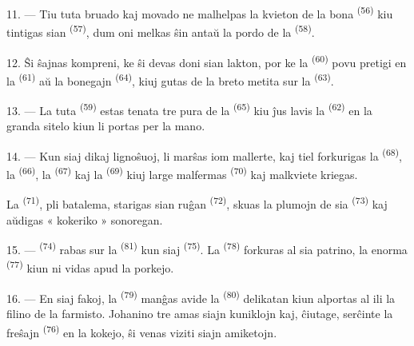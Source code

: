 11. --- Tiu tuta bruado kaj movado ne malhelpas la kvieton de la bona
 \textsuperscript{(56)} kiu tintigas sian
 \textsuperscript{(57)}, dum oni melkas ŝin antaŭ la pordo
de la  \textsuperscript{(58)}.

12. Ŝi ŝajnas kompreni, ke ŝi devas doni sian lakton, por ke la
 \textsuperscript{(60)} povu pretigi  en la
 \textsuperscript{(61)} aŭ la bonegajn 
\textsuperscript{(64)}, kiuj gutas de la breto metita sur la 
\textsuperscript{(63)}.

13. --- La tuta  \textsuperscript{(59)} estas tenata tre pura de
la  \textsuperscript{(65)} kiu ĵus lavis la
 \textsuperscript{(62)} en la granda sitelo kiun li portas
per la mano.

\VUsaut{3.0mm}
\VUsaut{3.0mm}

14. --- Kun siaj dikaj lignoŝuoj, li marŝas iom mallerte, kaj tiel forkurigas
la  \textsuperscript{(68)}, la 
\textsuperscript{(66)}, la  \textsuperscript{(67)} kaj la
 \textsuperscript{(69)} kiuj large malfermas  \textsuperscript{(70)} kaj malkviete kriegas.

La  \textsuperscript{(71)}, pli batalema, starigas sian ruĝan
 \textsuperscript{(72)}, skuas la plumojn de sia 
\textsuperscript{(73)} kaj aŭdigas « kokeriko » sonoregan.

15. ---  \textsuperscript{(74)} rabas sur la
 \textsuperscript{(81)} kun siaj 
\textsuperscript{(75)}. La  \textsuperscript{(78)} forkuras al
sia patrino, la enorma  \textsuperscript{(77)} kiun ni vidas
apud la porkejo.

16. --- En siaj fakoj, la  \textsuperscript{(79)} manĝas avide
la  \textsuperscript{(80)} delikatan kiun alportas al ili la
filino de la farmisto. Johanino tre amas siajn kuniklojn kaj, ĉiutage,
serĉinte la freŝajn  \textsuperscript{(76)} en la kokejo, ŝi
venas viziti siajn amiketojn.
\VUsaut{6.0mm}
\VUfilet{22mm}
